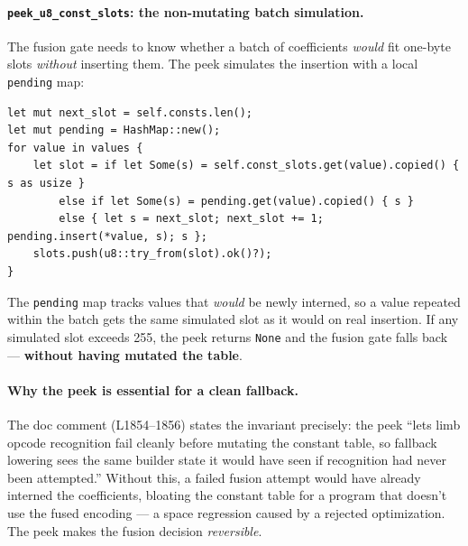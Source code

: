 \paragraph{\texttt{peek\_\allowbreak{}u8\_\allowbreak{}const\_\allowbreak{}slots}: the non-mutating batch simulation.}
The fusion gate needs to know whether a batch of coefficients
\emph{would} fit one-byte slots \emph{without} inserting them.
The peek simulates the insertion with a local \texttt{pending}
map:
\begin{lstlisting}[style=rust]
let mut next_slot = self.consts.len();
let mut pending = HashMap::new();
for value in values {
    let slot = if let Some(s) = self.const_slots.get(value).copied() { s as usize }
        else if let Some(s) = pending.get(value).copied() { s }
        else { let s = next_slot; next_slot += 1; pending.insert(*value, s); s };
    slots.push(u8::try_from(slot).ok()?);
}
\end{lstlisting}
The \texttt{pending} map tracks values that \emph{would} be newly
interned, so a value repeated within the batch gets the same
simulated slot as it would on real insertion. If any simulated
slot exceeds 255, the peek returns \texttt{None} and the fusion
gate falls back --- \textbf{without having mutated the table}.

\paragraph{Why the peek is essential for a clean fallback.}
The doc comment (L1854--1856) states the invariant precisely:
the peek ``lets limb opcode recognition fail cleanly before
mutating the constant table, so fallback lowering sees the same
builder state it would have seen if recognition had never been
attempted.'' Without this, a failed fusion attempt would have
already interned the coefficients, bloating the constant table
for a program that doesn't use the fused encoding --- a space
regression caused by a rejected optimization. The peek makes the
fusion decision \emph{reversible}.

